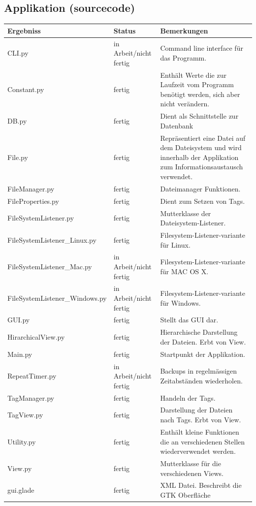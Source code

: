 \documentclass[10pt,paper=a4,final]{scrartcl}
\begin{document}
\subsection{Applikation (sourcecode)}
\begin{tabularx}{\textwidth}{|l|l|X|}
\hline
 \bf Ergebniss \cellcolor{blue!20!}& \bf Status \cellcolor{blue!20!}& \bf Bemerkungen \cellcolor{blue!20!} \\ \hline
CLI.py & in Arbeit/nicht fertig \cellcolor{red}& Command line interface f\"ur das Programm.\\ \hline
Constant.py & fertig \cellcolor{green}& Enth\"alt Werte die zur Laufzeit vom Programm ben\"otigt werden, sich aber nicht ver\"andern. \\ \hline
DB.py & fertig \cellcolor{green}& Dient als Schnittstelle zur Datenbank \\ \hline
File.py & fertig \cellcolor{green}& Repr\"asentiert eine Datei auf dem Dateisystem und wird innerhalb der Applikation zum Informationsaustausch verwendet. \\ \hline
FileManager.py & fertig \cellcolor{green}& Dateimanager Funktionen. \\ \hline
FileProperties.py & fertig \cellcolor{green}& Dient zum Setzen von Tags. \\ \hline
FileSystemListener.py & fertig \cellcolor{green}& Mutterklasse der Dateisystem-Listener. \\ \hline
FileSystemListener\_Linux.py & fertig \cellcolor{green}& Filesystem-Listener-variante f\"ur Linux. \\ \hline
FileSystemListener\_Mac.py & in Arbeit/nicht fertig \cellcolor{red}& Filesystem-Listener-variante f\"ur MAC OS X. \\ \hline
FileSystemListener\_Windows.py & in Arbeit/nicht fertig \cellcolor{red}& Filesystem-Listener-variante f\"ur Windows. \\ \hline
GUI.py & fertig \cellcolor{green}& Stellt das GUI dar. \\ \hline
HirarchicalView.py &  fertig \cellcolor{green}& Hierarchische Darstellung der Dateien. Erbt von View.\\ \hline
Main.py & fertig \cellcolor{green}& Startpunkt der Applikation. \\ \hline
RepeatTimer.py & in Arbeit/nicht fertig \cellcolor{red}& Backups in regelm\"assigen Zeitabst\"anden wiederholen. \\ \hline
TagManager.py & fertig \cellcolor{green}& Handeln der Tags. \\ \hline
TagView.py & fertig \cellcolor{green}& Darstellung der Dateien nach Tags. Erbt von View. \\ \hline
Utility.py & fertig \cellcolor{green}& Enth\"alt kleine Funktionen die an verschiedenen Stellen wiederverwendet werden. \\ \hline
View.py & fertig \cellcolor{green}& Mutterklasse f\"ur die verschiedenen Views. \\ \hline
gui.glade & fertig \cellcolor{green}& XML Datei. Beschreibt die GTK Oberfl\"ache \\ \hline
\end{tabularx}
\end{document}
